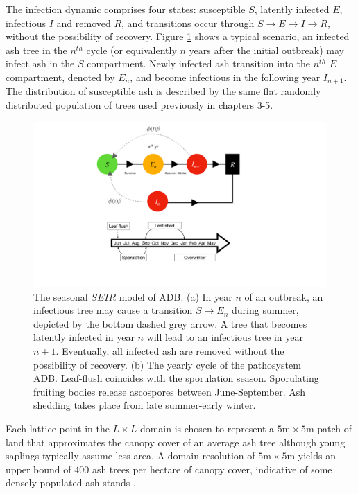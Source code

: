 The infection dynamic comprises four states: susceptible $S$, latently infected $E$, infectious $I$ and removed $R$, and transitions occur through $S\rightarrow E \rightarrow I \rightarrow R$, without the possibility of recovery. Figure \ref{fig:SEIR-transitions} shows a typical scenario, an infected ash tree in the $n^{th}$ cycle (or equivalently $n$ years after the initial outbreak) may infect ash in the $S$ compartment. 
Newly infected ash transition into the $n^{th}$ $E$ compartment, denoted by $E_n$, and become infectious in the following year $I_{n+1}$. The distribution of susceptible ash is described by the same flat randomly distributed population of trees used previously in chapters 3-5.

\begin{figure}
    \centering
    \includegraphics[scale=0.40]{chapter6/figures/fig1-seir-transitions.pdf}
    \caption{The seasonal $SEIR$ model of ADB. (a) In year $n$ of an outbreak, an infectious tree may cause a transition $S\rightarrow E_n$ during summer, depicted by the bottom dashed grey arrow. A tree that becomes latently infected in year $n$ will lead to an infectious tree in year $n+1$. Eventually, all infected ash are removed without the possibility of recovery. (b) The yearly cycle of the pathosystem ADB. Leaf-flush coincides with the sporulation season. Sporulating fruiting bodies release ascospores between June-September. Ash shedding takes place from late summer-early winter. }
    \label{fig:SEIR-transitions}
\end{figure}

Each lattice point in the $L\times L$ domain is chosen to represent a $5\mathrm{m}\times5\mathrm{m}$ patch of land that approximates the canopy cover of an average ash tree
\textemdash although young saplings typically assume less area. 
A domain resolution of $5\mathrm{m}\times5\mathrm{m}$ yields an upper bound of $400$ ash trees per hectare of canopy cover, indicative of some densely populated ash stands \cite{ash-tree2, ash-tree1}. %

